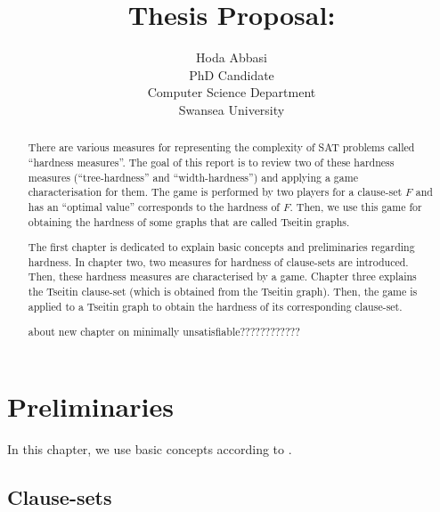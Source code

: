 \documentclass{report}
\begin{document}
\title{Thesis Proposal: 
       }

\author{Hoda Abbasi\\
        PhD Candidate\\
        Computer Science Department\\
        Swansea University\\}
\maketitle


\begin{abstract}
There are various measures for representing the complexity of SAT problems called ``hardness measures''. The goal of this report is to review two of these hardness measures (``tree-hardness'' and ``width-hardness'') and applying a game characterisation for them. The game is performed by two players for a clause-set $F$ and has an ``optimal value'' corresponds to the hardness of $F$. Then, we use this game for obtaining the hardness of some graphs that are called Tseitin graphs. 

The first chapter is dedicated to explain basic concepts and preliminaries regarding hardness. In chapter two, two measures for hardness of clause-sets are introduced. Then, these hardness measures are characterised by a game. Chapter three explains the Tseitin clause-set (which is obtained from the Tseitin graph). Then, the game is applied to a Tseitin graph to obtain the hardness of its corresponding clause-set.

about new chapter on minimally unsatisfiable????????????
\end{abstract}

\tableofcontents
\chapter{Preliminaries}
\label{cha:Preliminaries}

In this chapter, we use basic concepts according to \cite{h8, h18,h9}. 

\section{Clause-sets}
\label{sec:Clause-sets}
\end{document}
